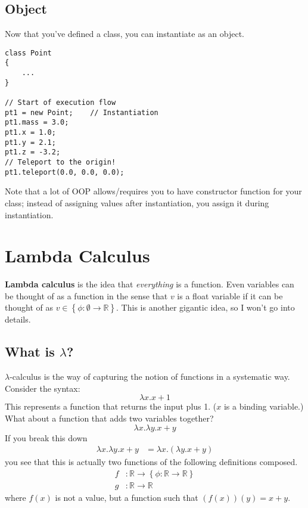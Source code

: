 \documentclass[12pt, a4paper]{article}
\theoremstyle{definition}
\begin{document}
\subsection{Object}
Now that you've defined a class, you can instantiate as an object.
\begin{lstlisting}
class Point
{
    ...
}

// Start of execution flow
pt1 = new Point;    // Instantiation
pt1.mass = 3.0;
pt1.x = 1.0;
pt1.y = 2.1;
pt1.z = -3.2;
// Teleport to the origin!
pt1.teleport(0.0, 0.0, 0.0);
\end{lstlisting}
Note that a lot of OOP allows/requires you to have constructor function for your class;
instead of assigning values after instantiation,
you assign it during instantiation.

\section{Lambda Calculus}
\textbf{Lambda calculus} is the idea that \textit{everything} is a function.
Even variables can be thought of as a function in the sense that
$v$ is a float variable if it can be thought of as $v \in \left\{ \phi : \emptyset \rightarrow \mathbb{R} \right\}$.
This is another gigantic idea, so I won't go into details.
\subsection{What is $\lambda$?}
$\lambda$-calculus is the way of capturing the notion of functions in a systematic way.
Consider the syntax:
\begin{equation*}
    \lambda x.x+1
\end{equation*}
This represents a function that returns the input plus 1.
($x$ is a binding variable.)
What about a function that adds two variables together?
\begin{equation*}
    \lambda x. \lambda y. x + y
\end{equation*}
If you break this down
\begin{align*}
    \lambda x. \lambda y. x + y &= \lambda x. \left( \lambda y. x + y \right)
\end{align*}
you see that this is actually two functions of the following definitions composed.
\begin{align*}
    f &: \mathbb{R} \rightarrow \left\{ \phi : \mathbb{R} \rightarrow \mathbb{R} \right\} \\
    g &: \mathbb{R} \rightarrow \mathbb{R}
\end{align*}
where $f(x)$ is not a value, but a function such that $(f(x)) (y) = x + y$.
\end{document}
